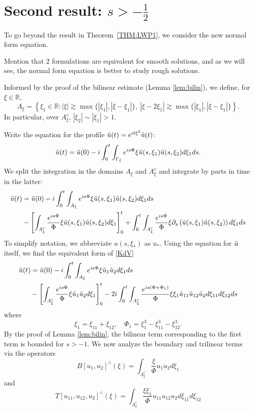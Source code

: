 \documentclass[a4paper, 11pt]{amsart}
\newcommand{\R}{\mathbb{R}}
\theoremstyle{plain}
\theoremstyle{definition}
\theoremstyle{remark}
\newcommand{\5}{\text{V}}
\numberwithin{equation}{section}
\theoremstyle{mytheoremstyle} \newtheorem{nota}[thm]{Remark}
\theoremstyle{mytheoremstyle} \newtheorem{exemplo}[thm]{Example}
\newcommand{\red}{\color{red}}
\newcommand{\blue}{\color{blue}}
\begin{document}
\section{Second result: $s> - \frac12$}
To go beyond the result in Theorem~\ref{THM:LWP1}, we consider the new normal form equation.

{\red Mention that 2 formulations are equivalent for smooth solutions, and as we will see, the normal form equation is better to study rough solutions.}


{
\blue


Informed by the proof of the bilinear estimate (Lemma \ref{lem:bilin}), we define, for $\xi\in \R$,
$$
A_\xi=\left\{\xi_1\in \R : |\xi|\gtrsim \max\{|\xi_1|, |\xi-\xi_1|\},\ |\xi-2\xi_1|\gtrsim \max\{|\xi_1|, |\xi-\xi_1|\} \right\}.
$$
In particular, over $A_\xi^c$, $|\xi_2|\sim |\xi_1|>1$.

Write the equation for the profile $\Tilde{u}(t)=e^{it\xi^3}\hat{u}(t)$:
$$
\Tilde{u}(t)=\Tilde{u}(0) - i\int_0^t \int_{\Gamma_\xi} e^{is\Phi}\xi \Tilde{u}(s,\xi_1)\Tilde{u}(s,\xi_2)d\xi_1 ds.
$$
We split the integration in the domains $A_\xi$ and $A^c_\xi$ and integrate by parts in time in the latter:
\begin{align*}
    \Tilde{u}(t)&=\Tilde{u}(0) - i \int_0^t \int_{A_\xi} e^{is\Phi}\xi \Tilde{u}(s,\xi_1)\Tilde{u}(s,\xi_2)d\xi_1 ds \\&- \left[\int_{A_\xi^c}\frac{e^{is\Phi}}{\Phi}\xi \Tilde{u}(s,\xi_1)\Tilde{u}(s,\xi_2)d\xi_1 \right]_0^t + \int_0^t \int_{A_\xi^c} \frac{e^{is\Phi}}{\Phi}\xi \partial_s\left(\Tilde{u}(s,\xi_1)\Tilde{u}(s,\xi_2)\right)d\xi_1 ds
\end{align*}
To simplify notation, we abbreviate $u(s,\xi_\ast)$ as $u_\ast$. Using the equation for $\Tilde{u}$ itself, we find the equivalent form of \eqref{KdV}
\begin{align*}
    \Tilde{u}(t)&=\Tilde{u}(0) - i \int_0^t \int_{A_\xi} e^{is\Phi}\xi \Tilde{u}_1\Tilde{u}_2d\xi_1 ds \\&- \left[\int_{A_\xi^c}\frac{e^{is\Phi}}{\Phi}\xi \Tilde{u}_1\Tilde{u}_2d\xi_1 \right]_0^t -2i \int_0^t \int_{A_\xi^c} \frac{e^{is(\Phi+\Phi_1)}}{\Phi}\xi\xi_1 \Tilde{u}_{11}\Tilde{u}_{12}\Tilde{u}_{2}d\xi_{11}d\xi_{12} ds
\end{align*}
where
$$
\xi_1=\xi_{11}+\xi_{12},\quad \Phi_1=\xi_1^3-\xi_{11}^3-\xi_{12}^3.
$$
By the proof of Lemma \ref{lem:bilin}, the bilinear term corresponding to the first term is bounded for $s>-1$. We now analyze the boundary and trilinear terms via the operators
\begin{equation}
    B[u_1,u_2]^\wedge(\xi)=\int_{A_\xi^c}\frac{\xi}{\Phi} u_1u_2d\xi_1
\end{equation}
and
\begin{equation}
    T[u_{11},u_{12},u_2]^\wedge(\xi)=\int_{A_\xi^c} \frac{\xi\xi_1}{\Phi}u_{11}u_{12}u_2d\xi_{11}d\xi_{12}
\end{equation}


}
\end{document}
